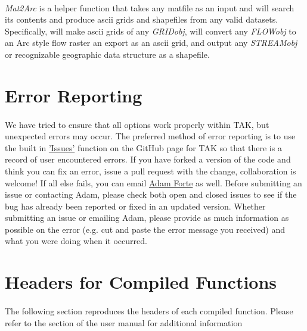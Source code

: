 \paragraph{}\textit{Mat2Arc} is a helper function that takes any matfile as an input and will search its contents and produce ascii grids and shapefiles from any valid datasets. Specifically, will make ascii grids of any \textit{GRIDobj}, will convert any \textit{FLOWobj} to an Arc style flow raster an export as an ascii grid, and output any \textit{STREAMobj} or recognizable geographic data structure as a shapefile.


\section{Error Reporting}
\paragraph{}We have tried to ensure that all options work properly within TAK, but unexpected errors may occur. The preferred method of error reporting is to use the built in \href{https://github.com/amforte/Topographic-Analysis-Kit/issues}{'Issues'} function on the GitHub page for TAK so that there is a record of user encountered errors. If you have forked a version of the code and think you can fix an error, issue a pull request with the change, collaboration is welcome! If all else fails, you can email \href{mailto:aforte8@lsu.edu}{Adam Forte} as well. Before submitting an issue or contacting Adam, please check both open and closed issues to see if the bug has already been reported or fixed in an updated version. Whether submitting an issue or emailing Adam, please provide as much information as possible on the error (e.g. cut and paste the error message you received) and what you were doing when it occurred.



\appendix

\section{Headers for Compiled Functions}\label{sec:CmpFuncCalls}
\paragraph{} The following section reproduces the headers of each compiled function. Please refer to the  section of the user manual for additional information

